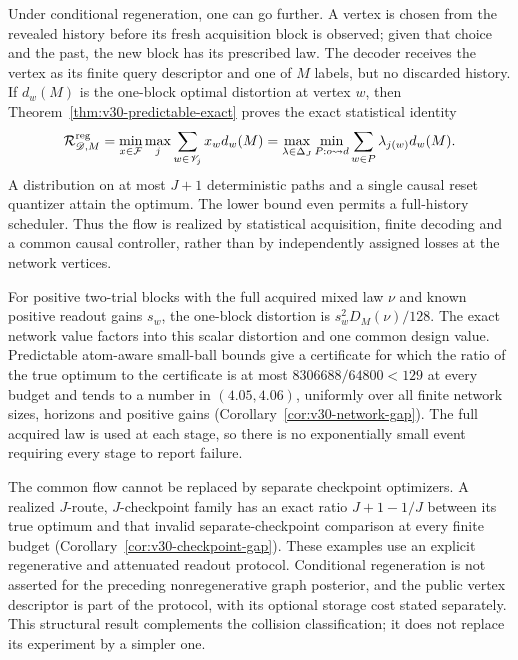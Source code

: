 Under conditional regeneration, one can go further. A vertex is chosen
from the revealed history before its fresh acquisition block is
observed; given that choice and the past, the new block has its prescribed
law. The decoder receives the vertex as its finite query descriptor
and one of $M$ labels, but no discarded history. If $d_w(M)$ is the
one-block optimal distortion at vertex $w$, then
Theorem~\ref{thm:v30-predictable-exact} proves the exact statistical
identity
\begin{equation}\label{eq:v30-intro-network}
 \mathcal R_{\mathscr D,M}^{\rm reg}
   =\min_{x\in\mathcal F}\max_j\sum_{w\in\mathscr V_j}x_wd_w(M)
   =\max_{\lambda\in\Delta_J}\min_{P:o\rightsquigarrow d}
                       \sum_{w\in P}\lambda_{j(w)}d_w(M).
\end{equation}
A distribution on at most $J+1$ deterministic paths and a single causal
reset quantizer attain the optimum. The lower bound even permits a
full-history scheduler. Thus the flow is realized by statistical
acquisition, finite decoding and a common causal controller, rather
than by independently assigned losses at the network vertices.

For positive two-trial blocks with the full acquired mixed law $\nu$
and known positive readout gains $s_w$, the one-block distortion is
$s_w^2D_M(\nu)/128$. The exact network value factors into this scalar
distortion and one common design value. Predictable atom-aware
small-ball bounds give a certificate for which the ratio of the true
optimum to the certificate is at most $8306688/64800<129$ at every budget and tends to a number
in $(4.05,4.06)$, uniformly over all finite network sizes, horizons and
positive gains (Corollary~\ref{cor:v30-network-gap}). The full acquired
law is used at each stage, so there is no exponentially small event
requiring every stage to report failure.

The common flow cannot be replaced by separate checkpoint optimizers.
A realized $J$-route, $J$-checkpoint family has an exact ratio
$J+1-1/J$ between its true optimum and that invalid separate-checkpoint
comparison at every finite budget
(Corollary~\ref{cor:v30-checkpoint-gap}). These examples use an explicit
regenerative and attenuated readout protocol. Conditional regeneration
is not asserted for the preceding nonregenerative graph posterior, and
the public vertex descriptor is part of the protocol, with its optional
storage cost stated separately. This structural result complements the
collision classification; it does not replace its experiment by a
simpler one.


